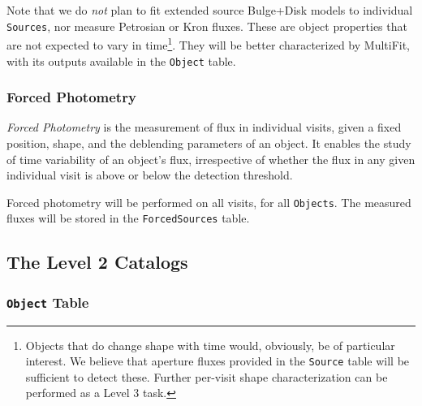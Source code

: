 \documentclass[12pt]{article}
\newcommand{\code}[1]{\texttt{#1}}
\newcommand{\Object}{\code{Object}\xspace}
\newcommand{\Objects}{\code{Objects}\xspace}
\newcommand{\Source}{\code{Source}\xspace}
\newcommand{\Sources}{\code{Sources}\xspace}
\newcommand{\ForcedSources}{\code{ForcedSources}\xspace}
\begin{document}
Note that we do {\em not} plan to fit extended source Bulge+Disk models to individual \Sources, nor measure Petrosian or Kron fluxes. These are object properties that are not expected to vary in time\footnote{Objects that {\em} do change shape with time would, obviously, be of particular interest. We believe that aperture fluxes provided in the \Source table will be sufficient to detect these. Further per-visit shape characterization can be performed as a Level 3 task.}. They will be better characterized by MultiFit, with its outputs available in the \Object table.

\subsubsection{Forced Photometry}
\label{sec:forcedPhotL2}



{\em Forced Photometry} is the measurement of flux in individual visits, given a fixed position, shape, and the deblending parameters of an object. It enables the study of time variability of an object's flux, irrespective of whether the flux in any given individual visit is above or below the detection threshold.

Forced photometry will be performed on all visits, for all \Objects. The measured fluxes will be stored in the \ForcedSources table.

\subsection{The Level 2 Catalogs}

\subsubsection{\Object Table}
\label{sec:objectTable}
\end{document}
